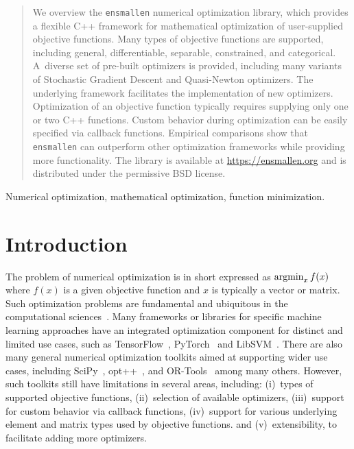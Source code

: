\documentclass[twoside,11pt]{article}
\begin{document}
\begin{abstract}%
We overview the {\tt ensmallen} numerical optimization library,
which provides a flexible C++ framework
for mathematical optimization of user-supplied objective functions.
Many types of objective functions are supported,
including general, differentiable, separable, constrained, and categorical.
A~diverse set of pre-built optimizers is provided,
including many variants of Stochastic Gradient Descent and Quasi-Newton optimizers.
The underlying framework facilitates the implementation of new optimizers.
Optimization of an objective function typically requires supplying only one or two {C++} functions.
Custom behavior during optimization can be easily specified via callback functions.
Empirical comparisons show that {\tt ensmallen}
can outperform other optimization frameworks while providing more functionality.
The library is available at \url{https://ensmallen.org}
and is distributed under the permissive BSD license.

\end{abstract}

\begin{keywords}
  Numerical optimization, mathematical optimization, function minimization.
\end{keywords}


\section{Introduction}

The problem of numerical optimization is in short expressed as
$\operatornamewithlimits{argmin}_x f(x)$
where $f(x)$ is a given objective function and $x$ is typically a vector or matrix.
Such optimization problems are fundamental and ubiquitous in the computational sciences~\citep{Nocedal_2006}.
Many frameworks or libraries for specific machine learning approaches
have an integrated optimization component for distinct and limited use cases,
such as
TensorFlow~\citep{tensorflow2015-whitepaper},
PyTorch~\citep{NEURIPS2019_9015}
and LibSVM~\citep{libsvm2011}.
There are also many general numerical optimization toolkits
aimed at supporting wider use cases,
including SciPy~\citep{2019arXiv190710121V},
opt++~\citep{meza1994opt++},
and 
OR-Tools~\citep{ortools} among many others.
However, such toolkits still have limitations in several areas,
including:
(i)~types of supported objective functions,
(ii)~selection of available optimizers,
(iii)~support for custom behavior via callback functions,
(iv)~support for various underlying element and matrix types used by objective functions.
and
(v)~extensibility, to facilitate adding more optimizers.
\end{document}
